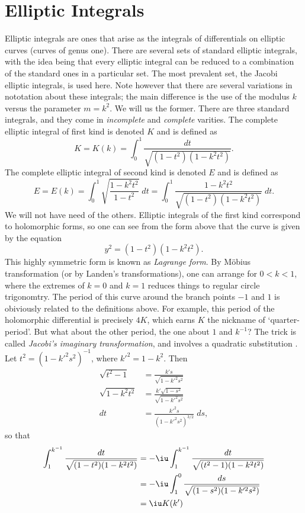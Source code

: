 \documentclass{article}
\begin{document}
\section{Elliptic Integrals}
Elliptic integrals are ones that arise as the integrals of differentials on elliptic curves (curves of genus one). There are several sets of standard elliptic integrals, with the idea being that every elliptic integral can be reduced to a combination of the standard ones in a particular set. The most prevalent set, the Jacobi elliptic integrals, is used here. Note however that there are several variations in nototation about these integrals; the main difference is the use of the modulus $k$ versus the parameter $m = k^2$. We will us the former. There are three standard integrals, and they come in {\it incomplete} and {\it complete} varities. The complete elliptic integral of first kind is denoted $K$ and is defined as
\[
K = K(k) = \int_0^1 \frac{dt}{\sqrt{(1-t^2)(1-k^2 t^2)}} .
\]
The complete elliptic integral of second kind is denoted $E$ and is defined as
\[
E = E(k) = \int_0^1 \sqrt{\frac{1-k^2 t^2}{1-t^2}} \;dt = \int_0^1 \frac{1-k^2 t^2}{\sqrt{(1-t^2)(1-k^2 t^2)}}\;dt .
\]
We will not have need of the others. Elliptic integrals of the first kind correspond to holomorphic forms, so one can see from the form above that the curve is given by the equation
\[
y^2 = (1-t^2)(1-k^2 t^2).
\]
This highly symmetric form is known as {\it Lagrange form}. By M\"obius transformation (or by Landen's transformations), one can arrange for $0< k < 1$, where the extremes of $k=0$ and $k=1$ reduces things to regular circle trigonomtry. The period of this curve around the branch points $-1$ and $1$ is obiviously related to the definitions above. For example, this period of the holomorphic differential is precisely $4K$, which earns $K$ the nickname of `quarter-period'. But what about the other period, the one about $1$ and $k^{-1}$? The trick is called {\it Jacobi's imaginary transformation}, and involves a quadratic substitution \cite{whittaker02}. Let $t^2 = (1-k'^2 s^2)^{-1}$, where $k'^2 = 1 - k^2$. Then
\begin{align*}
\sqrt{t^2 - 1} &= \frac{k's}{\sqrt{1-k'^2 s^2}} \\
\sqrt{1 - k^2 t^2} &= \frac{k' \sqrt{1-s^2}}{\sqrt{1-k'^2 s^2}} \\
dt &= \frac{k'^2 s}{(1-k'^2 s^2)^{3/2}}\;ds,
\end{align*}
so that
\begin{align*}
\int_1^{k^{-1}} \frac{dt}{\sqrt{(1-t^2)(1-k^2 t^2)}}
&= -\iu \int_1^{k^{-1}} \frac{dt}{\sqrt{(t^2-1)(1-k^2 t^2)}}\\
&= -\iu \int_1^0 \frac{ds}{\sqrt{(1-s^2)(1-k'^2 s^2)}}\\
&= \iu K(k')
\end{align*}
\end{document}
